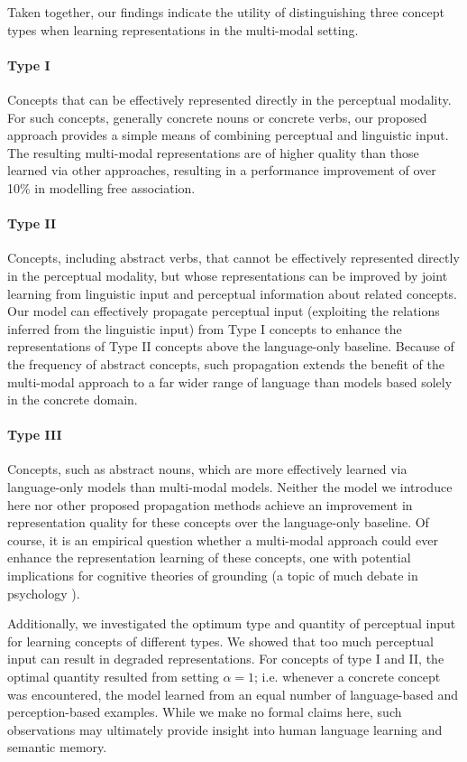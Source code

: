 Taken together, our findings indicate the utility of distinguishing three concept types when learning representations in the multi-modal setting. 

\paragraph{Type I}Concepts that can be effectively represented directly in the perceptual modality. For such concepts, generally concrete nouns or concrete verbs, our proposed approach provides a simple means of combining perceptual and linguistic input. The resulting multi-modal representations are of higher quality than those learned via other approaches, resulting in a performance improvement of over 10\% in modelling free association.

\paragraph{Type II}Concepts, including abstract verbs, that cannot be effectively represented directly in the perceptual modality, but whose representations can be improved by joint learning from linguistic input and perceptual information about related concepts. Our model can effectively propagate perceptual input (exploiting the relations inferred from the linguistic input) from Type I concepts to enhance the representations of Type II concepts above the language-only baseline. Because of the frequency of abstract concepts, such propagation extends the benefit of the multi-modal approach to a far wider range of language than models based solely in the concrete domain. 

\paragraph{Type III}Concepts, such as abstract nouns, which are more effectively learned via language-only models than multi-modal models. Neither the model we introduce here nor other proposed propagation methods achieve an improvement in representation quality for these concepts over the language-only baseline. Of course, it is an empirical question whether a multi-modal approach could ever enhance the representation learning of these concepts, one with potential implications for cognitive theories of grounding (a topic of much debate in psychology \cite{grafton2009embodied,barsalou2010grounded}). 

Additionally, we investigated the optimum type and quantity of perceptual input for learning concepts of different types. We showed that too much perceptual input can result in degraded representations. For concepts of type I and II, the optimal quantity resulted from setting \(\alpha = 1\); i.e. whenever a concrete concept was encountered, the model learned from an equal number of language-based and perception-based examples. While we make no formal claims here, such observations may ultimately provide insight into human language learning and semantic memory. 

